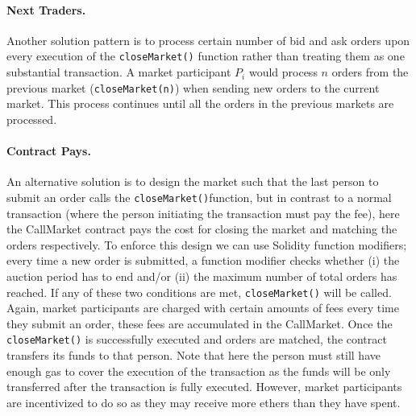
\paragraph{Next Traders.} Another solution pattern is to process certain number of bid and ask orders upon every execution of the \texttt{closeMarket()} function rather than treating them as one substantial transaction. A market participant $P_i$ would process $n$ orders from the previous market (\texttt{closeMarket(n)}) when sending new orders to the current market. This process continues until all the orders in the previous markets are processed. %


\paragraph{Contract Pays.} An alternative solution is to design the market such that the last person to submit an order calls the \texttt{closeMarket()}function, but in contrast to a normal transaction (where the person initiating the transaction must pay the fee), here the CallMarket contract pays the cost for closing the market and matching the orders respectively. To enforce this design we can use Solidity function modifiers; every time a new order is submitted, a function modifier checks whether (i) the auction period has to end and/or (ii) the maximum number of total orders has reached. If any of these two conditions are met, \texttt{closeMarket()} will be called. Again, market participants are charged with certain amounts of fees every time they submit an order, these fees are accumulated in the CallMarket. Once the  \texttt{closeMarket()} is successfully executed and orders are matched, the contract transfers its funds to that person. Note that here the person must still have enough gas to cover the execution of the transaction as the funds will be only transferred after the transaction is fully executed. However, market participants are incentivized to do so as they may receive more ethers than they have spent.

